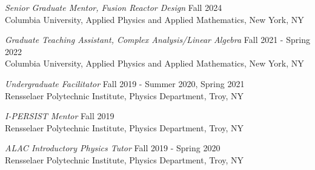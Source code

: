 \documentclass{rpires}
\begin{document}
\begin{resume}
    \textit{Senior Graduate Mentor, Fusion Reactor Design} \hfill Fall 2024 \\
    Columbia University, Applied Physics and Applied Mathematics, New York, NY
    \vspace{-0.1cm}

    \textit{Graduate Teaching Assistant, Complex Analysis/Linear Algebra} \hfill Fall 2021 - Spring 2022 \\
    Columbia University, Applied Physics and Applied Mathematics, New York, NY
    \vspace{-0.1cm}

    \textit{Undergraduate Facilitator} \hfill Fall 2019 - Summer 2020, Spring 2021 \\
    Rensselaer Polytechnic Institute, Physics Department, Troy, NY
    \vspace{-0.1cm}

    \textit{I-PERSIST Mentor} \hfill Fall 2019 \\
    Rensselaer Polytechnic Institute, Physics Department, Troy, NY
    \vspace{-0.1cm}

    \textit{ALAC Introductory Physics Tutor} \hfill Fall 2019 - Spring 2020 \\
    Rensselaer Polytechnic Institute, Physics Department, Troy, NY
    \vspace{-0.1cm}


\end{resume}
\end{document}
